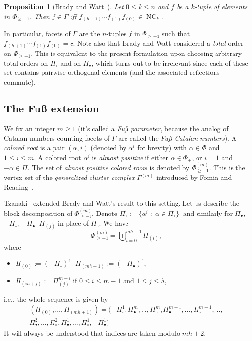 \documentclass[11pt]{article}
\newtheorem{prop}[theo]{Proposition}
\theoremstyle{definition}
\DeclareMathOperator{\NC}{NC}
\begin{document}
\begin{prop}[Brady and Watt~\cite{bradywatt}]
    Let $0\leq k \leq n$ and $f$ be a $k$-tuple of elements in $\Phi_{\geq -1}$.  Then $f\in \Gamma$ iff $ f_{(h+1)} \cdots f_{(1)} f_{(0)} \in \NC_k$.
\end{prop}

In particular, facets of $\Gamma$ are the $n$-tuples $f$ in $\Phi_{\geq -1}$ such that $ f_{(h+1)} \cdots f_{(1)} f_{(0)} = c$.  Note also that Brady and Watt considered a {\it total} order on $\Phi_{\geq -1}$.  This is equivalent to the present formulation upon choosing arbitrary total orders on $\Pi_\circ$ and on $\Pi_\bullet$, which turns out to be irrelevant since each of these set contains pairwise orthogonal elements (and the associated reflections commute).

\subsection{The Fuß extension}

We fix an integer $m\geq 1$ (it's called a {\it Fuß parameter}, because the analog of Catalan numbers counting facets of $\Gamma$ are called the {\it Fuß-Catalan numbers}).  A {\it colored root} is a pair $(\alpha,i)$ (denoted by $\alpha^i$ for brevity) with $\alpha\in \Phi$ and $1\leq i \leq m$.  A colored root $\alpha^i$ is {\it almost positive} if either $\alpha \in \Phi_+$, or $i=1$ and $-\alpha\in\Pi$. The set of {\it almost positive colored roots} is denoted by $\Phi^{(m)}_{\geq -1}$.  This is the vertex set of the {\it generalized cluster complex} $\Gamma^{(m)}$ introduced by Fomin and Reading~\cite{fominreading}.  

Tzanaki~\cite{tzanaki} extended Brady and Watt's result to this setting.  Let us describe the block decomposition of $\Phi^{(m)}_{\geq -1}$.  Denote $\Pi_\circ^i := \{ \alpha^i \;:\; \alpha\in\Pi_\circ \}$, and similarly for $\Pi_\bullet$, $-\Pi_\circ$, $-\Pi_\bullet$, $\Pi_{(j)}$ in place of $\Pi_\circ$.  We have 
\begin{equation}\label{eq:phi_decomp}
    \Phi^{(m)}_{\geq -1}
    =
    \biguplus_{i=0}^{mh+1}
    \varPi_{(i)},
\end{equation}
where 
\begin{itemize}
    \item $\varPi_{(0)} := (-\Pi_\circ)^1$,  $\varPi_{(mh+1)} := (-\Pi_\bullet)^1$,
    \item $\varPi_{(ih+j)} := \Pi_{(j)}^{m-i}$ if $0\leq i \leq m-1$ and $1\leq j \leq h$,
\end{itemize}
i.e., the whole sequence is given by
\begin{equation}
    \begin{aligned}
(\varPi_{(0)},\dots,\varPi_{(mh+1)})
    = 
    (-\Pi_\circ^1, \Pi_\bullet^m, \dots, \Pi_\circ^{m}, \Pi_\bullet^{m-1}, \dots, \Pi_\circ^{m-1}, \dots, \\ \Pi_\bullet^2, \dots, \Pi_\circ^2, 
    \Pi_\bullet^1, \dots, \Pi_\circ^1, -\Pi_\bullet^1)
    \end{aligned}
\end{equation}
It will always be understood that indices are taken modulo $mh+2$.
\end{document}
